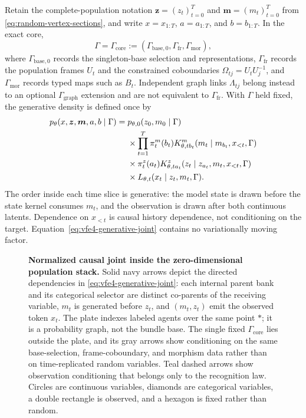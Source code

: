Retain the complete-population notation $\boldsymbol z=(z_t)_{t=0}^{T}$ and $\boldsymbol m=(m_t)_{t=0}^{T}$ from \cref{eq:random-vertex-sections}, and write $x=x_{1:T}$, $a=a_{1:T}$, and $b=b_{1:T}$. In the exact core,
\begin{equation}
\Gamma=\Gamma_{\mathrm{core}}
:=
(\Gamma_{\mathrm{base},0},\Gamma_{\mathrm{fr}},\Gamma_{\mathrm{mor}}),
\label{eq:core-geometry-sector-split}
\end{equation}
where $\Gamma_{\mathrm{base},0}$ records the singleton-base selection and representations, $\Gamma_{\mathrm{fr}}$ records the population frames $U_t$ and the constrained coboundaries $\Omega_{tj}=U_tU_j^{-1}$, and $\Gamma_{\mathrm{mor}}$ records typed maps such as $B_t$. Independent graph links $\Lambda_{tj}$ belong instead to an optional $\Gamma_{\mathrm{graph}}$ extension and are not equivalent to $\Gamma_{\mathrm{fr}}$. With $\Gamma$ held fixed, the generative density is defined once by
\begin{equation}
\begin{aligned}
p_\theta(x,\boldsymbol z,\boldsymbol m,a,b\mid\Gamma)
={}&p_{\theta,0}(z_0,m_0\mid\Gamma)\\
&\times\prod_{t=1}^{T}\pi_t^m(b_t)
K^m_{\theta,tb_t}(m_t\mid m_{b_t},x_{<t},\Gamma)\\
&\times\pi_t^z(a_t)
K^z_{\theta,ta_t}(z_t\mid z_{a_t},m_t,x_{<t},\Gamma)\\
&\times L_{\theta,t}(x_t\mid z_t,m_t,\Gamma).
\end{aligned}
\label{eq:vfe4-generative-joint}
\end{equation}
The order inside each time slice is generative: the model state is drawn before the state kernel consumes $m_t$, and the observation is drawn after both continuous latents.  Dependence on $x_{<t}$ is causal history dependence, not conditioning on the target.  Equation~\eqref{eq:vfe4-generative-joint} contains no variationally moving factor.

\begin{figure}[htbp]
\centering
\resizebox{\textwidth}{!}{}
\caption{%
\textbf{Normalized causal joint inside the zero-dimensional population stack.}
Solid navy arrows depict the directed dependencies in \cref{eq:vfe4-generative-joint}: each internal parent bank and its categorical selector are distinct co-parents of the receiving variable, $m_t$ is generated before $z_t$, and $(m_t,z_t)$ emit the observed token $x_t$. The plate indexes labeled agents over the same point $\ast$; it is a probability graph, not the bundle base. The single fixed $\Gamma_{\mathrm{core}}$ lies outside the plate, and its gray arrows show conditioning on the same base-selection, frame-coboundary, and morphism data rather than on time-replicated random variables. Teal dashed arrows show observation conditioning that belongs only to the recognition law. Circles are continuous variables, diamonds are categorical variables, a double rectangle is observed, and a hexagon is fixed rather than random.
}
\label{fig:vfe4-factor-graph}
\end{figure}

